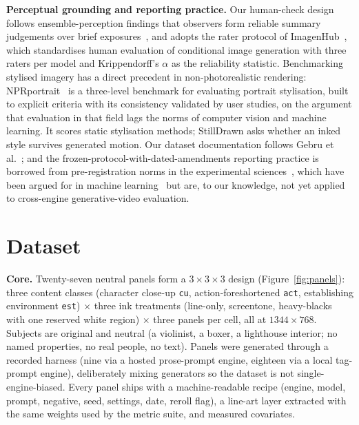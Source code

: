 \documentclass[11pt]{article}
\begin{document}
\textbf{Perceptual grounding and reporting practice.} Our human-check design
follows ensemble-perception findings that observers form reliable summary
judgements over brief exposures~\cite{ariely2001sets,whitney2018ensemble},
and adopts the rater protocol of
ImagenHub~\cite{ku2023imagenhub}, which standardises
human evaluation of conditional image generation with three raters per model
and Krippendorff's $\alpha$ as the reliability statistic. Benchmarking
stylised imagery has a direct precedent in non-photorealistic rendering:
NPRportrait~\cite{rosin2022nprportrait} is a three-level benchmark for
evaluating portrait stylisation, built to explicit criteria with its
consistency validated by user studies, on the argument that evaluation in
that field lags the norms of computer vision and machine learning. It scores
static stylisation methods; StillDrawn asks whether an inked style survives
generated motion. Our
dataset documentation follows Gebru et al.~\cite{gebru2021datasheets}; and
the frozen-protocol-with-dated-amendments reporting practice is borrowed
from pre-registration norms in the experimental
sciences~\cite{nosek2018preregistration}, which have
been argued for in machine learning~\cite{bell2021perspectives,leech2024questionable} but are, to
our knowledge, not yet applied to cross-engine generative-video evaluation.

\section{Dataset}
\label{sec:dataset}

\textbf{Core.} Twenty-seven neutral panels form a $3\times3\times3$ design
(Figure~\ref{fig:panels}):
three content classes (character close-up \texttt{cu}, action-foreshortened
\texttt{act}, establishing environment \texttt{est}) $\times$ three ink
treatments (line-only, screentone, heavy-blacks with one reserved white
region) $\times$ three panels per cell, all at $1344\times768$. Subjects are
original and neutral (a violinist, a boxer, a lighthouse interior; no named
properties, no real people, no text). Panels were generated through a
recorded harness (nine via a hosted prose-prompt engine, eighteen via a
local tag-prompt engine), deliberately mixing generators so the dataset is
not single-engine-biased. Every panel ships with a machine-readable recipe
(engine, model, prompt, negative, seed, settings, date, reroll flag), a
line-art layer extracted with the same weights used by the metric suite, and
measured covariates.
\end{document}
